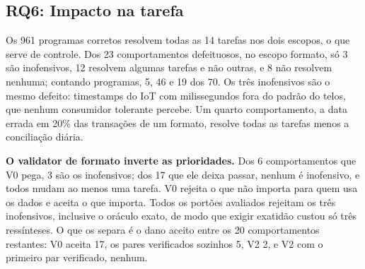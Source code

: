 \documentclass[sigconf,nonacm]{acmart}
\begin{document}
\subsection{RQ6: Impacto na tarefa}
\label{sec:rq6}

Os 961 programas corretos resolvem todas as 14 tarefas nos dois escopos, o que serve de controle. Dos 23 comportamentos defeituosos, no escopo formato, só 3 são inofensivos, 12 resolvem algumas tarefas e não outras, e 8 não resolvem nenhuma; contando programas, 5, 46 e 19 dos 70. Os três inofensivos são o mesmo defeito: timestamps do IoT com milissegundos fora do padrão do telos, que nenhum consumidor tolerante percebe. Um quarto comportamento, a data errada em 20\% das transações de um formato, resolve todas as tarefas menos a conciliação diária.

\textbf{O validator de formato inverte as prioridades.} Dos 6 comportamentos que V0 pega, 3 são os inofensivos; dos 17 que ele deixa passar, nenhum é inofensivo, e todos mudam ao menos uma tarefa. V0 rejeita o que não importa para quem usa os dados e aceita o que importa. Todos os portões avaliados rejeitam os três inofensivos, inclusive o oráculo exato, de modo que exigir exatidão custou só três ressínteses. O que os separa é o dano aceito entre os 20 comportamentos restantes: V0 aceita 17, os pares verificados sozinhos 5, V2 2, e V2 com o primeiro par verificado, nenhum.
\end{document}
